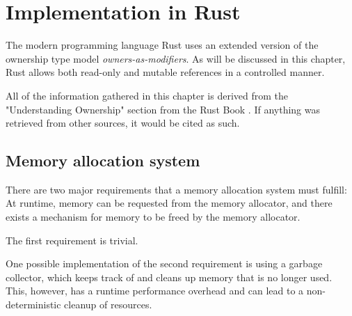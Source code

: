 \documentclass[sigplan,11pt,nonacm]{acmart}
\begin{document}







\section{Implementation in Rust}
\label{sec:implementation-rust}

The modern programming language Rust uses an extended version of the ownership type model \emph{owners-as-modifiers}.
As will be discussed in this chapter, Rust allows both read-only and mutable references in a controlled manner.

All of the information gathered in this chapter is derived from the "Understanding Ownership" section from the Rust Book \cite{rust-book}.
If anything was retrieved from other sources, it would be cited as such.

\subsection{Memory allocation system}
\label{sec:memory-allocation}

There are two major requirements that a memory allocation system must fulfill:
At runtime, memory can be requested from the memory allocator, and there exists a mechanism for memory to be freed by the memory allocator.

The first requirement is trivial.

One possible implementation of the second requirement is using a garbage collector, which keeps track of and cleans up memory that is no longer used.
This, however, has a runtime performance overhead and can lead to a non-deterministic cleanup of resources.
\end{document}
